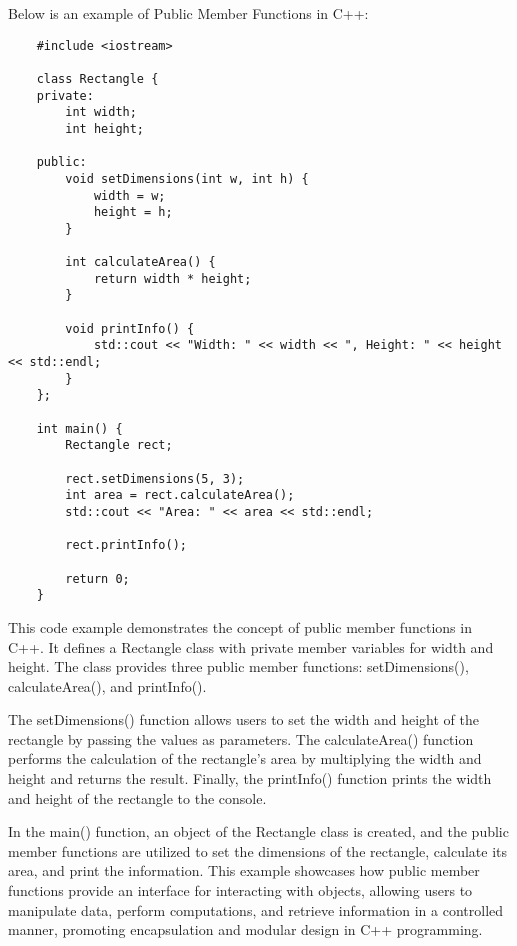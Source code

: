 \begin{solution}
    Below is an example of Public Member Functions in C++: \\
    \horizontalline
    \begin{verbatim}
    #include <iostream>

    class Rectangle {
    private:
        int width;
        int height;
        
    public:
        void setDimensions(int w, int h) {
            width = w;
            height = h;
        }
        
        int calculateArea() {
            return width * height;
        }
        
        void printInfo() {
            std::cout << "Width: " << width << ", Height: " << height << std::endl;
        }
    };
    
    int main() {
        Rectangle rect;
        
        rect.setDimensions(5, 3);
        int area = rect.calculateArea();
        std::cout << "Area: " << area << std::endl;
        
        rect.printInfo();
        
        return 0;
    }
    \end{verbatim}
    
    \horizontalline

    This code example demonstrates the concept of public member functions in C++. It defines a Rectangle class with private member variables for width and height. The class provides three public member functions: setDimensions(), calculateArea(), and printInfo().

    \noindent The setDimensions() function allows users to set the width and height of the rectangle by passing the values as parameters. The calculateArea() function performs the calculation of the rectangle's area by multiplying the width and height and returns the 
    result. Finally, the printInfo() function prints the width and height of the rectangle to the console.

    \noindent In the main() function, an object of the Rectangle class is created, and the public member functions are utilized to set the dimensions of the rectangle, calculate its area, and print the information. This example showcases how public member functions 
    provide an interface for interacting with objects, allowing users to manipulate data, perform computations, and retrieve information in a controlled manner, promoting encapsulation and modular design in C++ programming.
\end{solution}

